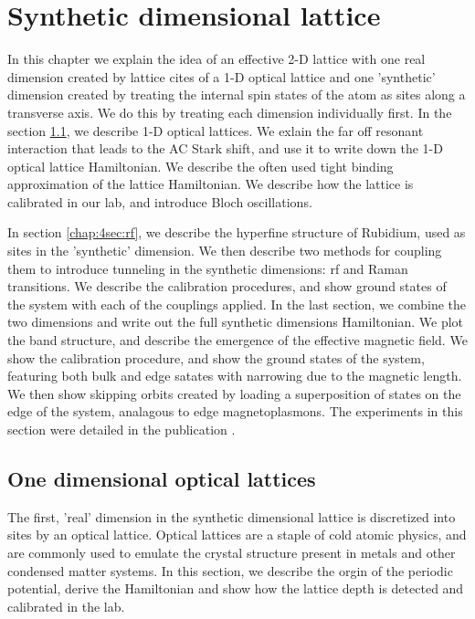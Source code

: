 
\renewcommand{\thechapter}{4}


\chapter{Synthetic dimensional lattice}
	In this chapter we explain the idea of an effective 2-D lattice with one real dimension created by lattice cites of a 1-D optical lattice and one 'synthetic' dimension created by treating the internal spin states of the atom as sites along a transverse axis. We do this by treating each dimension individually first. In the section \ref{chap:4sec:1DOL}, we describe 1-D optical lattices. We exlain the far off resonant interaction that leads to the AC Stark shift, and use it to write down the 1-D optical lattice Hamiltonian. We describe the often used tight binding approximation of the lattice Hamiltonian. We describe how the lattice is calibrated in our lab, and introduce Bloch oscillations. 


	In section \ref{chap:4sec:rf}, we describe the hyperfine structure of Rubidium, used as sites in the 'synthetic' dimension. We then describe two methods for coupling them to introduce tunneling in the synthetic dimensions: rf and Raman transitions. We describe the calibration procedures, and show ground states of the system with each of the couplings applied. In the last section, we combine the two dimensions and write out the full synthetic dimensions Hamiltonian. We plot the band structure, and describe the emergence of the effective magnetic field. We show the calibration procedure, and show the ground states of the system, featuring both bulk and edge satates with narrowing due to the magnetic length. We then show skipping orbits created by loading a superposition of states on the edge of the system, analagous to edge magnetoplasmons. The experiments in this section were detailed in the publication \cite{Stuhl2015}.


\section{One dimensional optical lattices}\label{chap:4sec:1DOL}
	The first, 'real' dimension in the synthetic dimensional lattice is discretized into sites by an optical lattice. Optical lattices are a staple of cold atomic physics, and are commonly used to emulate the crystal structure present in metals and other condensed matter systems. In this section, we describe the orgin of the periodic potential, derive the Hamiltonian and show how the lattice depth is detected and calibrated in the lab. 


